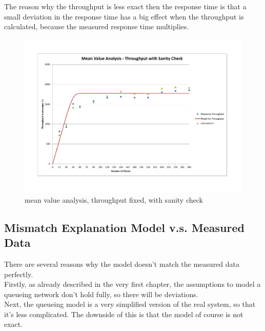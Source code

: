 \documentclass[a4paper]{article}
\begin{document}
The reason why the throughput is less exact then the response time is that a small deviation in the response time has a big effect when the throughput is calculated, because the measured response time multiplies.\\

\begin{landscape}\begin{figure}[H]
	\begin{center}
    \includegraphics[scale=0.7, trim = 23mm 28mm 24mm 24mm, clip]{measurements_increase_load/tp_sanity_check_total_fixed.pdf}
  \end{center}
  \caption{mean value analysis, throughput fixed, with sanity check}
  \label{fig:tp-sanity-check-total-fixed}
\end{figure}
\end{landscape}


\subsection{Mismatch Explanation Model v.s. Measured Data}

There are several reasons why the model doesn't match the measured data perfectly.\\

Firstly, as already described in the very first chapter, the assumptions to model a queueing network don't hold fully, so there will be deviations.\\

Next, the queueing model is a very simplified version of the real system, so that it's less complicated. The downside of this is that the model of course is not exact.\\
\end{document}
